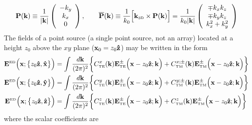\documentclass[letterpaper]{article}
\begin{document}
$$ \mathbf{P}(\mathbf{k}) \equiv
   \frac{1}{|\mathbf{k}|}
   \left(\begin{array}{c}-k_y \\ k_x \\ 0 \end{array}\right),
   \qquad
   \overline{\mathbf{P}}(\mathbf{k}) \equiv
   \frac{1}{k_0}\Big[ \mathbf{k}_{\hbox{\tiny{3D}}} \times \mathbf{P}(\mathbf{k}) \Big]
   =
   \frac{1}{k_0 |\mathbf{k}|}
   \left(\begin{array}{c} \mp k_x k_z \\ \mp k_y k_z \\ k_x^2 + k_y^2 
         \end{array}\right)
$$
The fields of a point source (a single point source, not an array)
located at a height $z_0$ above the $xy$ plane 
($\mathbf{x}_0=z_0 \mathbf{\hat z}$) may be written in the form
\begin{subequations}
\begin{align}
 \mathbf{E}^{\hbox{\tiny{ED}}}\Big(\mathbf{x}; \big\{ z_0 \mathbf{\hat z}, \mathbf{\hat x} \big\}\Big)
&= \int \frac{d \mathbf{k}}{(2\pi)^2} 
   \bigg\{ C^{x}_{\hbox{\tiny{TE}}}(\mathbf{k})
           \mathbf{E}^\pm_{\hbox{\tiny{TE}}}\Big(\mathbf{x}-z_0\mathbf{\hat z}; \mathbf{k}\Big)
          + 
           C^{x;\pm}_{\hbox{\tiny{TM}}}(\mathbf{k})
           \mathbf{E}^\pm_{\hbox{\tiny{TM}}}\Big(\mathbf{x}-z_0\mathbf{\hat z}; \mathbf{k}\Big)
   \bigg\}
\\
 \mathbf{E}^{\hbox{\tiny{ED}}}\Big(\mathbf{x}; \big\{ z_0 \mathbf{\hat z}, \mathbf{\hat y} \big\}\Big)
&= \int \frac{d \mathbf{k}}{(2\pi)^2} 
   \bigg\{ C^{y}_{\hbox{\tiny{TE}}}(\mathbf{k})
           \mathbf{E}^\pm_{\hbox{\tiny{TE}}}\Big(\mathbf{x}-z_0\mathbf{\hat z}; \mathbf{k}\Big)
          + 
           C^{y;\pm}_{\hbox{\tiny{TM}}}(\mathbf{k})
           \mathbf{E}^\pm_{\hbox{\tiny{TM}}}\Big(\mathbf{x}-z_0\mathbf{\hat z}; \mathbf{k}\Big)
   \bigg\}
\\
 \mathbf{E}^{\hbox{\tiny{ED}}}\Big(\mathbf{x}; \big\{ z_0 \mathbf{\hat z}, \mathbf{\hat z} \big\}\Big)
&= \int \frac{d \mathbf{k}}{(2\pi)^2} 
   \bigg\{ C^{z}_{\hbox{\tiny{TE}}}(\mathbf{k})
           \mathbf{E}^\pm_{\hbox{\tiny{TE}}}\Big(\mathbf{x}-z_0\mathbf{\hat z}; \mathbf{k}\Big)
          + 
           C^{z}_{\hbox{\tiny{TM}}}(\mathbf{k})
           \mathbf{E}^\pm_{\hbox{\tiny{TM}}}\Big(\mathbf{x}-z_0\mathbf{\hat z}; \mathbf{k}\Big)
   \bigg\}
\end{align}
\label{IncidentFieldsPWD}
\end{subequations}
where the scalar coefficients are
\end{document}
